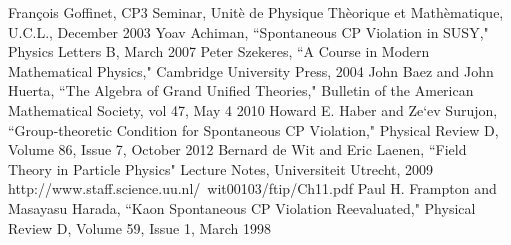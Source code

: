 \documentclass[floatfix,aps,prd,amsmath,amssymb]{revtex4}
\begin{document}
\begin{thebibliography}{10}
Fran\c{c}ois Goffinet, CP3 Seminar, Unit\`{e} de Physique Th\`{e}orique et Math\`{e}matique, U.C.L., December 2003
Yoav Achiman, ``Spontaneous CP Violation in SUSY," Physics Letters B, March 2007
Peter Szekeres, ``A Course in Modern Mathematical Physics," Cambridge University Press, 2004
John Baez and John Huerta, ``The Algebra of Grand Unified Theories," Bulletin of the American Mathematical Society, vol 47, May 4 2010
Howard E. Haber and Ze`ev Surujon, ``Group-theoretic Condition for Spontaneous CP Violation," Physical Review D, Volume 86, Issue 7, October 2012
Bernard de Wit and Eric Laenen, ``Field Theory in Particle Physics" Lecture Notes, Universiteit Utrecht, 2009 http://www.staff.science.uu.nl/~wit00103/ftip/Ch11.pdf
Paul H. Frampton and Masayasu Harada, ``Kaon Spontaneous CP Violation Reevaluated," Physical Review D, Volume 59, Issue 1, March 1998


\end{thebibliography}
\end{document}
